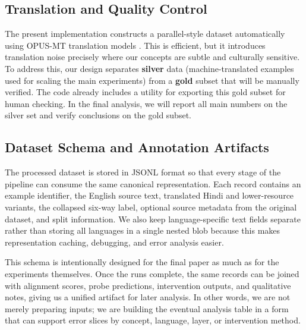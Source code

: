 \documentclass[11pt]{article}
\begin{document}
\subsection{Translation and Quality Control}
The present implementation constructs a parallel-style dataset automatically using OPUS-MT translation models \citep{tiedemann2020opusmt}. This is efficient, but it introduces translation noise precisely where our concepts are subtle and culturally sensitive. To address this, our design separates \textbf{silver} data (machine-translated examples used for scaling the main experiments) from a \textbf{gold} subset that will be manually verified. The code already includes a utility for exporting this gold subset for human checking. In the final analysis, we will report all main numbers on the silver set and verify conclusions on the gold subset.


\subsection{Dataset Schema and Annotation Artifacts}
The processed dataset is stored in JSONL format so that every stage of the pipeline can consume the same canonical representation. Each record contains an example identifier, the English source text, translated Hindi and lower-resource variants, the collapsed six-way label, optional source metadata from the original dataset, and split information. We also keep language-specific text fields separate rather than storing all languages in a single nested blob because this makes representation caching, debugging, and error analysis easier.

This schema is intentionally designed for the final paper as much as for the experiments themselves. Once the runs complete, the same records can be joined with alignment scores, probe predictions, intervention outputs, and qualitative notes, giving us a unified artifact for later analysis. In other words, we are not merely preparing inputs; we are building the eventual analysis table in a form that can support error slices by concept, language, layer, or intervention method.
\end{document}
